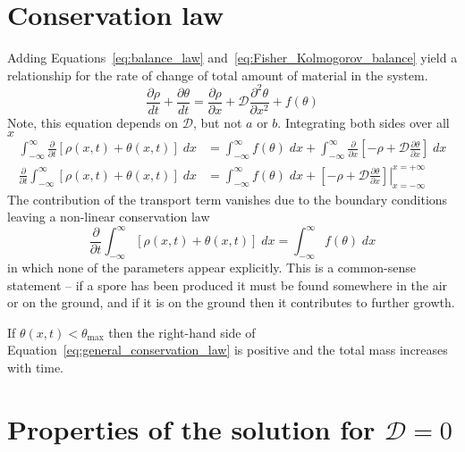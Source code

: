 \documentclass[12pt]{amsart}
\begin{document}
\section{Conservation law}

Adding Equations~\ref{eq:balance_law}
and~\ref{eq:Fisher_Kolmogorov_balance} yield a relationship for
the rate of change of total amount of material in the system.
\begin{equation}
  \frac{\partial\rho}{dt} + \frac{\partial\theta}{dt} =
  \frac{\partial \rho}{\partial x} +
  \mathcal{D}\frac{\partial^2\theta}{\partial x^2} +
  f(\theta)
\end{equation}
Note, this equation depends on $\mathcal{D}$,
but not $a$ or $b$.  Integrating both sides over all $x$
\begin{align}
  \int_{-\infty}^{\infty} \frac{\partial}{\partial t} \left[\rho(x,
    t)+\theta(x,t)\right]\; dx &=
  \int_{-\infty}^{\infty} f(\theta) \; dx +
  \int_{-\infty}^{\infty} \frac{\partial}{\partial x} \left[-\rho +
    \mathcal{D}\frac{\partial \theta}{\partial x}\right]\; dx \\
  \frac{\partial}{\partial t} \int_{-\infty}^{\infty}
  \left[\rho(x, t)+\theta(x,t)\right]\; dx &=
  \int_{-\infty}^{\infty} f(\theta) \; dx + \left.\left[-\rho +
    \mathcal{D}\frac{\partial \theta}{\partial
      x}\right]\right|_{x=-\infty}^{x=+\infty}
 \end{align}
The contribution of the transport term vanishes due to the boundary
conditions leaving a non-linear conservation law
\begin{equation}
  \frac{\partial}{\partial t} \int_{-\infty}^{\infty}
  \left[\rho(x, t)+\theta(x,t)\right]\; dx = \int_{-\infty}^{\infty}
  f(\theta) \; dx
  \label{eq:general_conservation_law}
\end{equation}
in which none of the parameters appear explicitly.  This is a
common-sense statement -- if a spore has been produced it must be
found somewhere in the air or on the ground, and if it is on the
ground then it contributes to further growth.

If $\theta(x, t) < \theta_{\max}$ then the right-hand side of
Equation~\ref{eq:general_conservation_law} is positive and the total
mass increases with time.


\section{Properties of the solution for $\mathcal{D}=0$}
\end{document}
